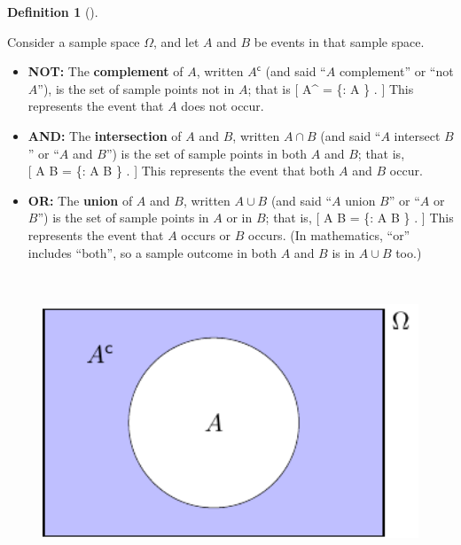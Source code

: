 \documentclass[
  letterpaper,
]{report}
\providecommand{\tightlist}{%
  \setlength{\itemsep}{0pt}\setlength{\parskip}{0pt}}\usepackage{longtable,booktabs,array}
\theoremstyle{definition}
\newtheorem{definition}{Definition}[chapter]
\theoremstyle{definition}
\theoremstyle{remark}
\begin{document}
\leavevmode{}%
\begin{definition}[]\label{def-sample-space}

Consider a sample space \(\Omega\), and let \(A\) and \(B\) be events in
that sample space.

\begin{itemize}
\tightlist
\item
  \textbf{{NOT:}} The \textbf{complement} of \(A\), written
  \(A^\mathsf{c}\) (and said ``\(A\) complement'' or ``not \(A\)''), is
  the set of sample points not in \(A\); that is {[} A\^{} =
  \{\omega \in \Omega : \omega \not\in A \} . {]} This represents the
  event that \(A\) does not occur.
\item
  \textbf{{AND}:} The \textbf{intersection} of \(A\) and \(B\), written
  \(A \cap B\) (and said ``\(A\) intersect \(B\)'' or ``\(A\) and
  \(B\)'') is the set of sample points in both \(A\) and \(B\); that
  is,\\
  {[} A \cap B = \{\omega \in \Omega : \omega \in A 
  \omega \in B \} . {]} This represents the event that both \(A\) and
  \(B\) occur.
\item
  \textbf{{OR:}} The \textbf{union} of \(A\) and \(B\), written
  \(A \cup B\) (and said ``\(A\) union \(B\)'' or ``\(A\) or \(B\)'') is
  the set of sample points in \(A\) or in \(B\); that is, {[} A \cup B =
  \{\omega \in \Omega : \omega \in A  \omega \in B \} . {]}
  This represents the event that \(A\) occurs or \(B\) occurs. (In
  mathematics, ``or'' includes ``both'', so a sample outcome in both
  \(A\) and \(B\) is in \(A\cup B\) too.)
\end{itemize}

~

\begin{figure}

{\centering \includegraphics[width=7.63889in,height=\textheight]{sections/L03-events_files/figure-pdf/venn-not-1.pdf}

}
\end{figure}
\end{definition}
\end{document}
